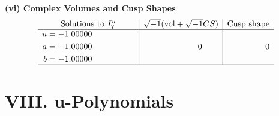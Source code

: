 \documentclass[1p]{elsarticle_modified}
\theoremstyle{definition}
\newcommand{\I}{\sqrt{-1}}
\begin{document}
\newpage\flushleft \textbf{(vi) Complex Volumes and Cusp Shapes}
$$\begin{array}{c|c|c}  
\text{Solutions to }I^u_{7}& \I (\text{vol} + \sqrt{-1}CS) & \text{Cusp shape}\\
 \hline 
\begin{aligned}
u &= -1.00000\phantom{ +0.000000I} \\
a &= -1.00000\phantom{ +0.000000I} \\
b &= -1.00000\phantom{ +0.000000I}\end{aligned}
 & \phantom{-0.000000 } 0 & \phantom{-0.000000 } 0\\
 \hline 
 \end{array}$$\newpage
\newpage\renewcommand{\arraystretch}{1}
\centering \section*{ VIII. u-Polynomials}
\end{document}
